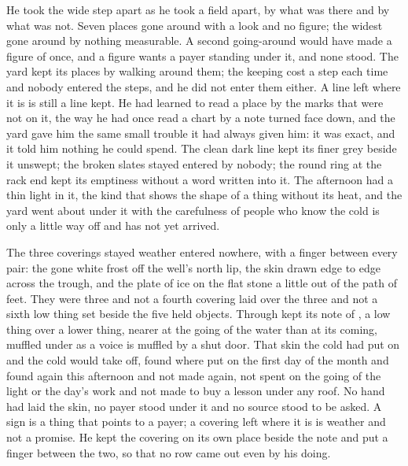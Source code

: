 He took the wide step apart as he took a field apart, by what was there and by what was not. Seven places gone around with a look and no figure; the widest gone around by nothing measurable. A second going-around would have made a figure of once, and a figure wants a payer standing under it, and none stood. The yard kept its places by walking around them; the keeping cost a step each time and nobody entered the steps, and he did not enter them either. A line left where it is is still a line kept. He had learned to read a place by the marks that were not on it, the way he had once read a chart by a note turned face down, and the yard gave him the same small trouble it had always given him: it was exact, and it told him nothing he could spend. The clean dark line kept its finer grey beside it unswept; the broken slates stayed entered by nobody; the round ring at the rack end kept its emptiness without a word written into it. The afternoon had a thin light in it, the kind that shows the shape of a thing without its heat, and the yard went about under it with the carefulness of people who know the cold is only a little way off and has not yet arrived.

\scenebreak

The three coverings stayed weather entered nowhere, with a finger between every pair: the gone white frost off the well's north lip, the skin drawn edge to edge across the trough, and the plate of ice on the flat stone a little out of the path of feet. They were three and not a fourth covering laid over the three and not a sixth low thing set beside the five held objects. Through   kept its note of , a low thing over a lower thing, nearer at the going of the water than at its coming, muffled under  as a voice is muffled by a shut door. That skin the cold had put on and the cold would take off, found where put on the first day of the month and found again this afternoon and not made again, not spent on the going of the light or the day's work and not made to buy a lesson under any roof. No hand had laid the skin, no payer stood under it and no source stood to be asked. A sign is a thing that points to a payer; a covering left where it is is weather and not a promise. He kept the covering on its own place beside the note and put a finger between the two, so that no row came out even by his doing.


